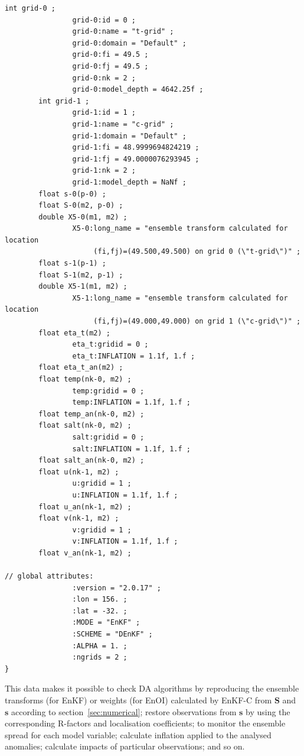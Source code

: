 \documentclass[11pt]{report}
\newcommand{\mb} {\mathbf}
\begin{document}
\begin{Verbatim}[frame=single,fontsize=\footnotesize]
        int grid-0 ;
                grid-0:id = 0 ;
                grid-0:name = "t-grid" ;
                grid-0:domain = "Default" ;
                grid-0:fi = 49.5 ;
                grid-0:fj = 49.5 ;
                grid-0:nk = 2 ;
                grid-0:model_depth = 4642.25f ;
        int grid-1 ;
                grid-1:id = 1 ;
                grid-1:name = "c-grid" ;
                grid-1:domain = "Default" ;
                grid-1:fi = 48.9999694824219 ;
                grid-1:fj = 49.0000076293945 ;
                grid-1:nk = 2 ;
                grid-1:model_depth = NaNf ;
        float s-0(p-0) ;
        float S-0(m2, p-0) ;
        double X5-0(m1, m2) ;
                X5-0:long_name = "ensemble transform calculated for location
                     (fi,fj)=(49.500,49.500) on grid 0 (\"t-grid\")" ;
        float s-1(p-1) ;
        float S-1(m2, p-1) ;
        double X5-1(m1, m2) ;
                X5-1:long_name = "ensemble transform calculated for location
                     (fi,fj)=(49.000,49.000) on grid 1 (\"c-grid\")" ;
        float eta_t(m2) ;
                eta_t:gridid = 0 ;
                eta_t:INFLATION = 1.1f, 1.f ;
        float eta_t_an(m2) ;
        float temp(nk-0, m2) ;
                temp:gridid = 0 ;
                temp:INFLATION = 1.1f, 1.f ;
        float temp_an(nk-0, m2) ;
        float salt(nk-0, m2) ;
                salt:gridid = 0 ;
                salt:INFLATION = 1.1f, 1.f ;
        float salt_an(nk-0, m2) ;
        float u(nk-1, m2) ;
                u:gridid = 1 ;
                u:INFLATION = 1.1f, 1.f ;
        float u_an(nk-1, m2) ;
        float v(nk-1, m2) ;
                v:gridid = 1 ;
                v:INFLATION = 1.1f, 1.f ;
        float v_an(nk-1, m2) ;

// global attributes:
                :version = "2.0.17" ;
                :lon = 156. ;
                :lat = -32. ;
                :MODE = "EnKF" ;
                :SCHEME = "DEnKF" ;
                :ALPHA = 1. ;
                :ngrids = 2 ;
}
\end{Verbatim}

This data makes it possible to check DA algorithms by reproducing the ensemble transforms (for EnKF) or weights (for EnOI) calculated by EnKF-C from $\mb S$ and $\mb s$ according to section~\ref{sec:numerical}; restore observations from $\mb s$ by using the corresponding R-factors and localisation coefficients; to monitor the ensemble spread for each model variable; calculate inflation applied to the analysed anomalies; calculate impacts of particular observations; and so on.
\end{document}
